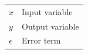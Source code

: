\begin{tabular}{ll}
$x$ & Input variable\\
$y$ & Output variable\\
$\epsilon$ & Error term\\
\end{tabular}
